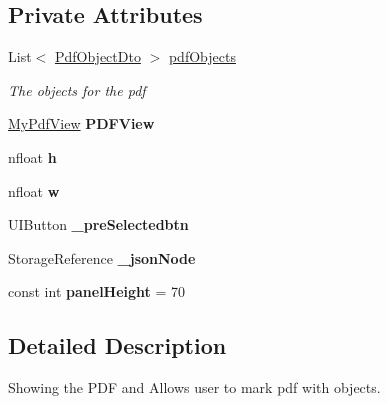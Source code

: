 \subsection*{Private Attributes}
\begin{DoxyCompactItemize}
\item 
List$<$ \hyperlink{class_ramboell_1_1i_o_s_1_1_pdf_object_dto}{Pdf\+Object\+Dto} $>$ \hyperlink{class_ramboell_1_1i_o_s_1_1_pdf_view_controller_ae92538214df4571ae24ccded6da10609}{pdf\+Objects}
\begin{DoxyCompactList}\small\item\em The objects for the pdf \end{DoxyCompactList}\item 
\mbox{\label{class_ramboell_1_1i_o_s_1_1_pdf_view_controller_a64fc418acef69d5ddf5991919135ecf3}} 
\hyperlink{class_ramboell_1_1i_o_s_1_1_pdf_view_controller_1_1_my_pdf_view}{My\+Pdf\+View} {\bfseries P\+D\+F\+View}
\item 
\mbox{\label{class_ramboell_1_1i_o_s_1_1_pdf_view_controller_aa49ce5510df519448c768cc7868f7533}} 
nfloat {\bfseries h}
\item 
\mbox{\label{class_ramboell_1_1i_o_s_1_1_pdf_view_controller_a8b30539f325520b3919609a87de383db}} 
nfloat {\bfseries w}
\item 
\mbox{\label{class_ramboell_1_1i_o_s_1_1_pdf_view_controller_a5505533213a5f82d5a34ca7c5514d5d8}} 
U\+I\+Button {\bfseries \+\_\+pre\+Selectedbtn}
\item 
\mbox{\label{class_ramboell_1_1i_o_s_1_1_pdf_view_controller_a7d098fbe2fd772475f1bcc6de9d665f9}} 
Storage\+Reference {\bfseries \+\_\+json\+Node}
\item 
\mbox{\label{class_ramboell_1_1i_o_s_1_1_pdf_view_controller_ab6de5c3b8d72a66479d9a681a7c692d7}} 
const int {\bfseries panel\+Height} = 70
\end{DoxyCompactItemize}


\subsection{Detailed Description}
Showing the P\+DF and Allows user to mark pdf with objects. 



